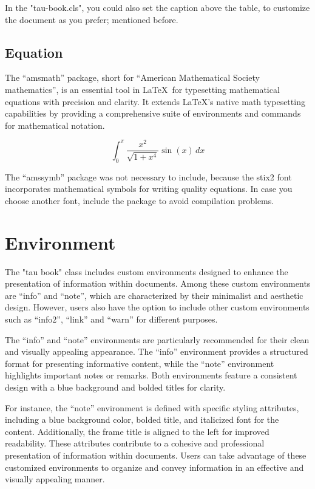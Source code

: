 \documentclass[10pt,a4paper,twoside]{tau-book}
\begin{document}
            In the "tau-book.cls", you could also set the caption above the table, to customize the document as you prefer; mentioned before.

    \subsection{Equation}

        The ``amsmath'' package, short for ``American Mathematical Society mathematics'', is an essential tool in \LaTeX\ for typesetting mathematical equations with precision and clarity. It extends LaTeX's native math typesetting capabilities by providing a comprehensive suite of environments and commands for mathematical notation.

        \begin{equation}
            \int_{0}^{\pi} \frac{x^2}{\sqrt{1 + x^4}} \sin(x) \, dx
        \end{equation}

    \begin{info}
        The ``amssymb'' package was not necessary to include, because the stix2 font incorporates mathematical symbols for writing quality equations. In case you choose another font, include the package to avoid compilation problems.
    \end{info}

    \section{Environment}

        The "tau book" class includes custom environments designed to enhance the presentation of information within documents. Among these custom environments are ``info'' and ``note'', which are characterized by their minimalist and aesthetic design. However, users also have the option to include other custom environments such as ``info2'', ``link'' and ``warn'' for different purposes.

        The ``info'' and ``note'' environments are particularly recommended for their clean and visually appealing appearance. The ``info'' environment provides a structured format for presenting informative content, while the ``note'' environment highlights important notes or remarks. Both environments feature a consistent design with a blue background and bolded titles for clarity.

        For instance, the ``note'' environment is defined with specific styling attributes, including a blue background color, bolded title, and italicized font for the content. Additionally, the frame title is aligned to the left for improved readability. These attributes contribute to a cohesive and professional presentation of information within documents.  Users can take advantage of these customized environments to organize and convey information in an effective and visually appealing manner.
\end{document}
